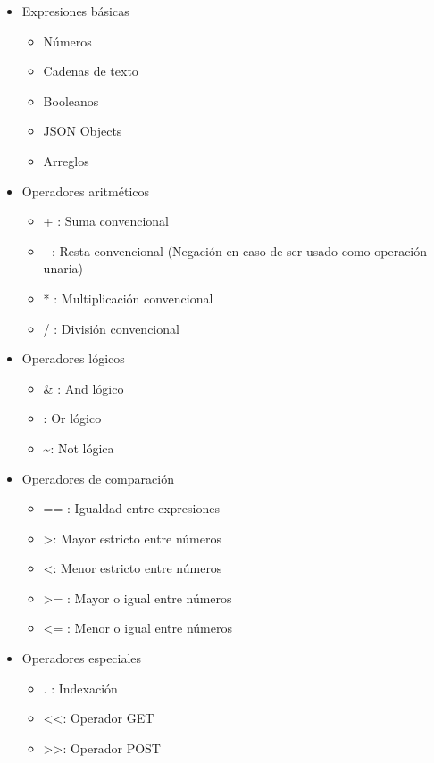 \documentclass[12pt,a4paper,final]{article}
\begin{document}
\begin{itemize}

\item Expresiones básicas
\begin{itemize}
\item Números
\item Cadenas de texto
\item Booleanos
\item JSON Objects
\item Arreglos
\end{itemize}

\item Operadores aritméticos
\begin{itemize}
\item + : Suma convencional 
\item - : Resta convencional (Negación en caso de ser usado como operación unaria)
\item * : Multiplicación convencional
\item / : División convencional
\end{itemize}

\item Operadores lógicos
\begin{itemize}
\item \& : And lógico
\item \textbar : Or lógico
\item \textasciitilde : Not lógica
\end{itemize}

\item Operadores de comparación
\begin{itemize}
\item == : Igualdad entre expresiones
\item \textgreater : Mayor estricto entre números
\item \textless : Menor estricto entre números
\item {\textgreater}= : Mayor o igual entre números
\item {\textless}= : Menor o igual entre números
\end{itemize}

\item Operadores especiales
\begin{itemize}
\item . : Indexación
\item \textless\textless : Operador GET
\item \textgreater\textgreater : Operador POST
\end{itemize}
\end{itemize}
\end{document}
